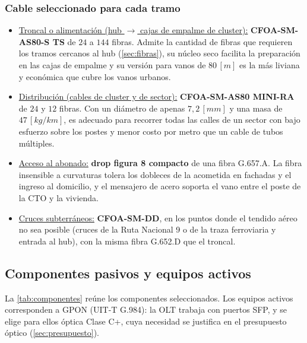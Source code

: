 \subsubsection{Cable seleccionado para cada tramo}
\begin{itemize}
    \item \underline{Troncal o alimentación (hub $\rightarrow$ cajas de empalme de cluster):} \textbf{CFOA-SM-AS80-S TS} de $24$ a $144$ fibras. Admite la cantidad de fibras que requieren los tramos cercanos al hub (\autoref{sec:fibras}), su núcleo seco facilita la preparación en las cajas de empalme y su versión para vanos de $80 \, [m]$ es la más liviana y económica que cubre los vanos urbanos.
    \item \underline{Distribución (cables de cluster y de sector):} \textbf{CFOA-SM-AS80 MINI-RA} de $24$ y $12$ fibras. Con un diámetro de apenas $7{,}2 \, [mm]$ y una masa de $47 \, [kg/km]$, es adecuado para recorrer todas las calles de un sector con bajo esfuerzo sobre los postes y menor costo por metro que un cable de tubos múltiples.
    \item \underline{Acceso al abonado:} \textbf{drop figura 8 compacto} de una fibra G.657.A. La fibra insensible a curvaturas tolera los dobleces de la acometida en fachadas y el ingreso al domicilio, y el mensajero de acero soporta el vano entre el poste de la CTO y la vivienda.
    \item \underline{Cruces subterráneos:} \textbf{CFOA-SM-DD}, en los puntos donde el tendido aéreo no sea posible (cruces de la Ruta Nacional 9 o de la traza ferroviaria y entrada al hub), con la misma fibra G.652.D que el troncal.
\end{itemize}

\subsection{Componentes pasivos y equipos activos}
\label{sec:pasivos_activos}
La \autoref{tab:componentes} reúne los componentes seleccionados. Los equipos activos corresponden a GPON (UIT-T G.984): la OLT trabaja con puertos SFP, y se elige para ellos óptica Clase C+, cuya necesidad se justifica en el presupuesto óptico (\autoref{sec:presupuesto}).

